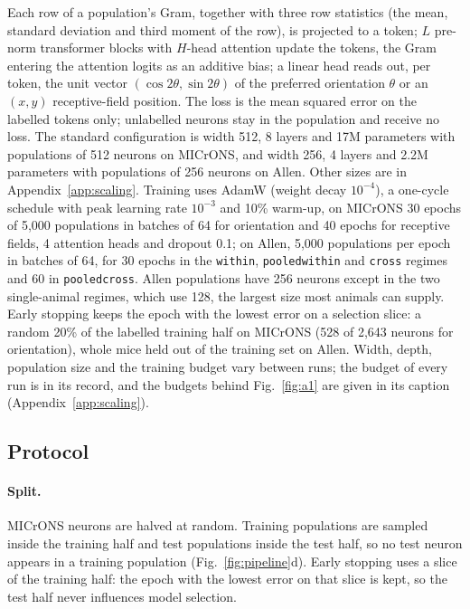 \documentclass[11pt]{article}
\newcommand{\code}[1]{\texttt{#1}}
\begin{document}
Each row of a population's Gram, together with three row statistics (the mean, standard deviation and third moment of the row), is projected to a token; $L$ pre-norm transformer blocks \citep{vaswani2017,xiong2020} with $H$-head attention update the tokens, the Gram entering the attention logits as an additive bias; a linear head reads out, per token, the unit vector $(\cos 2\theta, \sin 2\theta)$ of the preferred orientation $\theta$ or an $(x,y)$ receptive-field position. The loss is the mean squared error on the labelled tokens only; unlabelled neurons stay in the population and receive no loss. The standard configuration is width 512, 8 layers and 17M parameters with populations of 512 neurons on MICrONS, and width 256, 4 layers and 2.2M parameters with populations of 256 neurons on Allen. Other sizes are in Appendix~\ref{app:scaling}. Training uses AdamW (weight decay $10^{-4}$), a one-cycle schedule with peak learning rate $10^{-3}$ and 10\% warm-up, on MICrONS 30 epochs of 5,000 populations in batches of 64 for orientation and 40 epochs for receptive fields, 4 attention heads and dropout 0.1; on Allen, 5,000 populations per epoch in batches of 64, for 30 epochs in the \code{within}, \code{pooledwithin} and \code{cross} regimes and 60 in \code{pooledcross}. Allen populations have 256 neurons except in the two single-animal regimes, which use 128, the largest size most animals can supply. Early stopping keeps the epoch with the lowest error on a selection slice: a random 20\% of the labelled training half on MICrONS (528 of 2,643 neurons for orientation), whole mice held out of the training set on Allen. Width, depth, population size and the training budget vary between runs; the budget of every run is in its record, and the budgets behind Fig.~\ref{fig:a1} are given in its caption (Appendix~\ref{app:scaling}).

\subsection{Protocol}

\paragraph{Split.} MICrONS neurons are halved at random. Training populations are sampled inside the training half and test populations inside the test half, so no test neuron appears in a training population (Fig.~\ref{fig:pipeline}d). Early stopping uses a slice of the training half: the epoch with the lowest error on that slice is kept, so the test half never influences model selection.
\end{document}
